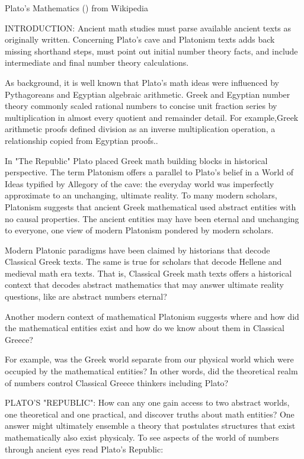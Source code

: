 \documentclass[12pt]{article}
\begin{document}
Plato's Mathematics () from Wikipedia

INTRODUCTION: Ancient math studies must parse available ancient texts as originally written. Concerning Plato's cave and Platonism texts adds back missing shorthand steps, must point out initial number theory facts, and include intermediate and final number theory calculations.

As background, it is well known that Plato's math ideas were influenced by Pythagoreans and Egyptian algebraic arithmetic. Greek and Egyptian number theory commonly scaled rational numbers to concise unit fraction series by multiplication in almost every quotient and remainder detail. For example,Greek arithmetic proofs defined division as an inverse multiplication operation, a relationship copied from Egyptian proofs.. 
    
In "The Republic" Plato placed Greek math building blocks in historical perspective. The term Platonism offers a parallel to Plato's belief in a World of Ideas typified by Allegory of the cave: the everyday world was imperfectly approximate to an unchanging, ultimate reality. To many modern scholars, Platonism suggests that ancient Greek mathematical used abstract entities with no causal properties. The ancient entities may have been eternal and unchanging to everyone, one view of modern Platonism pondered by modern scholars.

Modern Platonic paradigms have been claimed by historians that decode Classical Greek texts. The same is true for scholars that decode Hellene and medieval math era texts. That is, Classical Greek math texts offers a historical context that decodes abstract mathematics that may answer ultimate reality questions, like are abstract numbers eternal?

Another modern context of mathematical Platonism suggests where and how did the mathematical entities exist and how do we know about them in Classical Greece? 

For example, was the Greek world separate from our physical world which were occupied by the mathematical entities?  In other words, did the theoretical realm of numbers control Classical Greece thinkers including Plato? 

PLATO'S "REPUBLIC": How can any one gain access to two abstract worlds, one theoretical and one practical, and discover truths about math entities? One answer might ultimately ensemble a theory that postulates structures that exist mathematically also exist physicaly. To see aspects of the world of numbers through ancient eyes read Plato's Republic:
\end{document}
